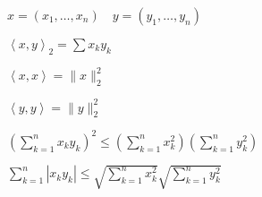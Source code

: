 \documentclass{book}
\theoremstyle{definition}
\begin{document}
   \begin{statement}

        $x = (x_1, \ldots, x_{n} )\quad y = (y_1, \ldots, y_{n} )$

        $\left<x, y \right>_2 = \sum x_ky_k$

        $\left<x, x \right> = \|x\|_2^2$

        $\left<y, y \right> = \|y\|_2^2$

        $\left( \sum_{k=1}^{n} x_ky_k \right) ^2 \leqslant \left( \sum_{k=1}^{n} x_k^2 \right) \left( \sum_{k=1}^{n} y_k^2 \right) $

        $\sum_{k=1}^{n} |x_ky_k|\leqslant \sqrt{\sum_{k=1}^{n} x_k^2} \sqrt{\sum_{k=1}^{n} y_k^2} $
    \end{statement}
\end{document}
